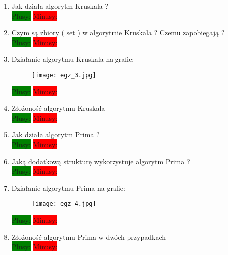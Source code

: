 \documentclass[a4paper,11pt]{article}
\begin{document}
\begin{enumerate}


\item Jak działa algorytm Kruskala ?  \\
\colorbox{green}{Plusy:} \colorbox{red}{Minusy: } 
 
\item Czym są zbiory ( set ) w algorytmie Kruskala ? Czemu zapobiegają ?  \\
\colorbox{green}{Plusy:} \colorbox{red}{Minusy: } 
 
\item Działanie algorytmu Kruskala na grafie: 
\begin{figure}[H]
\texttt{[image: egz\_3.jpg]}
\end{figure}
\colorbox{green}{Plusy:} \colorbox{red}{Minusy: } 
  
\item Złożoność algorytmu Kruskala \\
\colorbox{green}{Plusy:} \colorbox{red}{Minusy: } 

\item Jak działa algorytm Prima ?  \\
\colorbox{green}{Plusy:} \colorbox{red}{Minusy: } 
 
\item Jaką dodatkową strukturę wykorzystuje algorytm Prima ?  \\
\colorbox{green}{Plusy:} \colorbox{red}{Minusy: } 
 
\item Działanie algorytmu Prima na grafie: 
\begin{figure}[H]
\texttt{[image: egz\_4.jpg]}
\end{figure}
\colorbox{green}{Plusy:} \colorbox{red}{Minusy: } 
  
\item Złożoność algorytmu Prima w dwóch przypadkach \\
\colorbox{green}{Plusy:} \colorbox{red}{Minusy: }

\end{enumerate}

 
\end{document}
